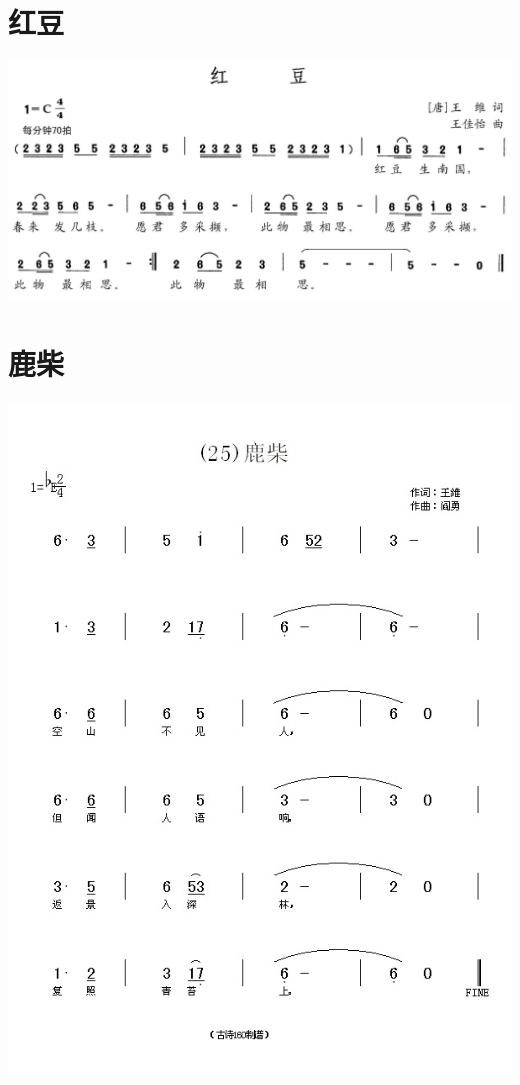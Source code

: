 \documentclass[cn,pad,chinesefont=nofont]{elegantbook}
\begin{document}
\section{红豆}
    \includegraphics[width=\textwidth]{dongxiao/20200628-王维-红豆} 
\section{鹿柴}
    \includegraphics[width=\textwidth]{dongxiao/20200627-王维-鹿柴.jpg} 
\end{document}
